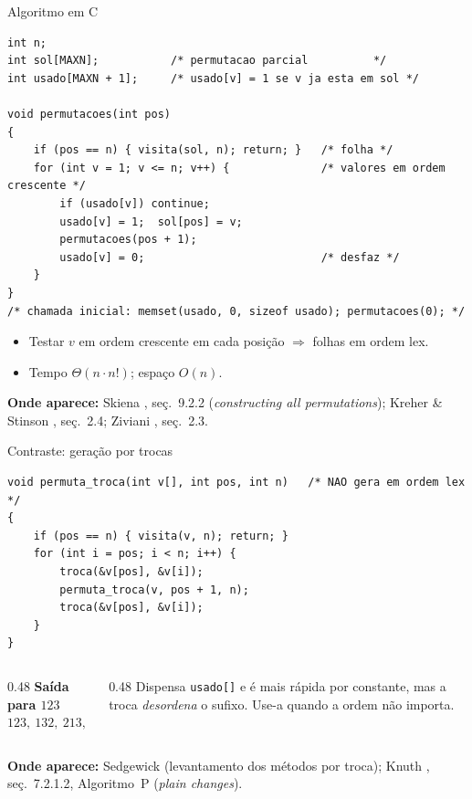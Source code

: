 \documentclass[aspectratio=169]{beamer}
\newcommand{\fonte}[1]{%
  \par\vspace{1pt}%
  {\tiny\color{gray!30!black}\textbf{Onde aparece:} #1\par}}
\begin{document}
\begin{frame}[fragile]{Algoritmo em C}
\begin{lstlisting}[style=estiloCmini]
int n;
int sol[MAXN];           /* permutacao parcial          */
int usado[MAXN + 1];     /* usado[v] = 1 se v ja esta em sol */

void permutacoes(int pos)
{
    if (pos == n) { visita(sol, n); return; }   /* folha */
    for (int v = 1; v <= n; v++) {              /* valores em ordem crescente */
        if (usado[v]) continue;
        usado[v] = 1;  sol[pos] = v;
        permutacoes(pos + 1);
        usado[v] = 0;                           /* desfaz */
    }
}
/* chamada inicial: memset(usado, 0, sizeof usado); permutacoes(0); */
\end{lstlisting}
  \begin{itemize}
    \item Testar $v$ em ordem crescente em cada posição $\Rightarrow$ folhas em ordem lex.
    \item Tempo $\Theta(n \cdot n!)$; espaço $O(n)$.
  \end{itemize}
  \fonte{Skiena \cite{skiena2020algorithm}, seç.~9.2.2 (\textit{constructing all permutations});
    Kreher \& Stinson \cite{kreher1999combinatorial}, seç.~2.4; Ziviani \cite{ziviani2011projeto}, seç.~2.3.}
\end{frame}

\begin{frame}[fragile]{Contraste: geração por trocas}
\begin{lstlisting}[style=estiloCmini]
void permuta_troca(int v[], int pos, int n)   /* NAO gera em ordem lex */
{
    if (pos == n) { visita(v, n); return; }
    for (int i = pos; i < n; i++) {
        troca(&v[pos], &v[i]);
        permuta_troca(v, pos + 1, n);
        troca(&v[pos], &v[i]);
    }
}
\end{lstlisting}
  \begin{columns}[T]
    \begin{column}{0.48\textwidth}
      \textbf{Saída para $123$}\\
      $123,\ 132,\ 213,\ 231,\ 321,\ 312$
    \end{column}
    \begin{column}{0.48\textwidth}
      Dispensa \texttt{usado[]} e é mais rápida por constante, mas a troca
      \emph{desordena} o sufixo. Use-a quando a ordem não importa.
    \end{column}
  \end{columns}
  \fonte{Sedgewick \cite{sedgewick1977permutation} (levantamento dos métodos por troca);
    Knuth \cite{knuth2011taocp4a}, seç.~7.2.1.2, Algoritmo~P (\textit{plain changes}).}
\end{frame}
\end{document}
